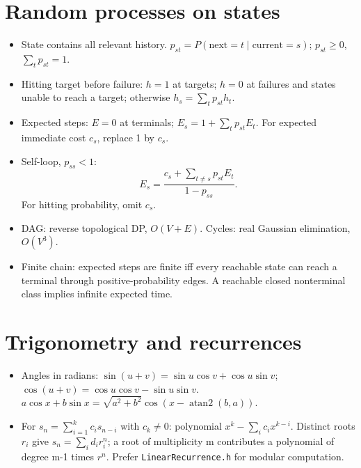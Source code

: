 
\section{Random processes on states}
\begin{itemize}[nosep,leftmargin=*]
\item State contains all relevant history.
$p_{st}=P(\text{next}=t\mid\text{current}=s)$;
$p_{st}\ge0$, $\sum_t p_{st}=1$.
\item Hitting target before failure:
$h=1$ at targets; $h=0$ at failures and states unable to reach a target;
otherwise $h_s=\sum_t p_{st}h_t$.
\item Expected steps: $E=0$ at terminals;
$E_s=1+\sum_t p_{st}E_t$.
For expected immediate cost $c_s$, replace 1 by $c_s$.
\item Self-loop, $p_{ss}<1$:
\[
 E_s=\frac{c_s+\sum_{t\ne s}p_{st}E_t}{1-p_{ss}}.
\]
For hitting probability, omit $c_s$.
\item DAG: reverse topological DP, $O(V+E)$.
Cycles: real Gaussian elimination, $O(V^3)$.
\item Finite chain: expected steps are finite iff every reachable state
can reach a terminal through positive-probability edges.
A reachable closed nonterminal class implies infinite expected time.
\end{itemize}
\section{Trigonometry and recurrences}
\begin{itemize}[nosep,leftmargin=*]
\item Angles in radians:
$\sin(u+v)=\sin u\cos v+\cos u\sin v$;
$\cos(u+v)=\cos u\cos v-\sin u\sin v$.
$a\cos x+b\sin x=\sqrt{a^2+b^2}\cos(x-\operatorname{atan2}(b,a))$.
\item For $s_n=\sum_{i=1}^k c_i s_{n-i}$ with $c_k\ne0$: polynomial
$x^k-\sum_i c_ix^{k-i}$. Distinct roots $r_i$ give $s_n=\sum_i d_ir_i^n$;
a root of multiplicity m contributes a polynomial of degree m-1 times $r^n$.
Prefer \texttt{LinearRecurrence.h} for modular computation.
\end{itemize}
\par
